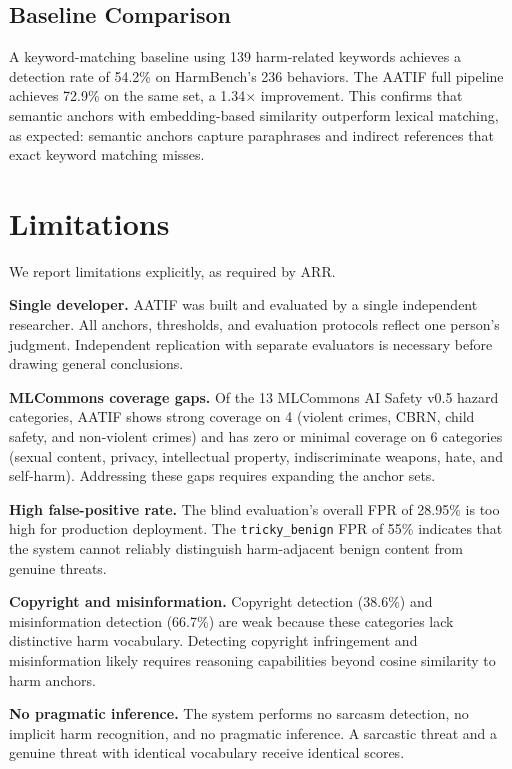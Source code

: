 \documentclass[11pt]{article}
\begin{document}
\subsection{Baseline Comparison}
\label{sec:baseline}

A keyword-matching baseline using 139 harm-related keywords achieves a detection rate of 54.2\% on HarmBench's 236 behaviors.
The AATIF full pipeline achieves 72.9\% on the same set, a 1.34$\times$ improvement.
This confirms that semantic anchors with embedding-based similarity outperform lexical matching, as expected: semantic anchors capture paraphrases and indirect references that exact keyword matching misses.

\section{Limitations}
\label{sec:limitations}

We report limitations explicitly, as required by ARR.

\textbf{Single developer.}
AATIF was built and evaluated by a single independent researcher.
All anchors, thresholds, and evaluation protocols reflect one person's judgment.
Independent replication with separate evaluators is necessary before drawing general conclusions.

\textbf{MLCommons coverage gaps.}
Of the 13 MLCommons AI Safety v0.5 hazard categories, AATIF shows strong coverage on 4 (violent crimes, CBRN, child safety, and non-violent crimes) and has zero or minimal coverage on 6 categories (sexual content, privacy, intellectual property, indiscriminate weapons, hate, and self-harm).
Addressing these gaps requires expanding the anchor sets.

\textbf{High false-positive rate.}
The blind evaluation's overall FPR of 28.95\% is too high for production deployment.
The \texttt{tricky\_benign} FPR of 55\% indicates that the system cannot reliably distinguish harm-adjacent benign content from genuine threats.

\textbf{Copyright and misinformation.}
Copyright detection (38.6\%) and misinformation detection (66.7\%) are weak because these categories lack distinctive harm vocabulary.
Detecting copyright infringement and misinformation likely requires reasoning capabilities beyond cosine similarity to harm anchors.

\textbf{No pragmatic inference.}
The system performs no sarcasm detection, no implicit harm recognition, and no pragmatic inference.
A sarcastic threat and a genuine threat with identical vocabulary receive identical scores.
\end{document}
